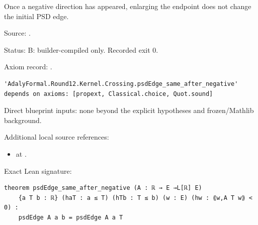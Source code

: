\begin{theorem}[bp-226]
\label{bp-226}
\uses{}
\leanok
Once a negative direction has appeared, enlarging the endpoint does not change the initial PSD edge.

\par Source: \texttt{}.
\par Status: B: builder-compiled only. Recorded exit 0.
\par Axiom record: \texttt{}.
\begin{verbatim}
'AdalyFormal.Round12.Kernel.Crossing.psdEdge_same_after_negative' depends on axioms: [propext, Classical.choice, Quot.sound]
\end{verbatim}
\par Direct blueprint inputs: none beyond the explicit hypotheses and frozen/Mathlib background.
\par Additional local source references:
\begin{itemize}
\item \texttt{} at \texttt{}.
\end{itemize}
\par Exact Lean signature:
\begin{verbatim}
theorem psdEdge_same_after_negative (A : ℝ → E →L[ℝ] E)
    {a T b : ℝ} (haT : a ≤ T) (hTb : T ≤ b) (w : E) (hw : ⟪w,A T w⟫ < 0) :
    psdEdge A a b = psdEdge A a T
\end{verbatim}
\end{theorem}

